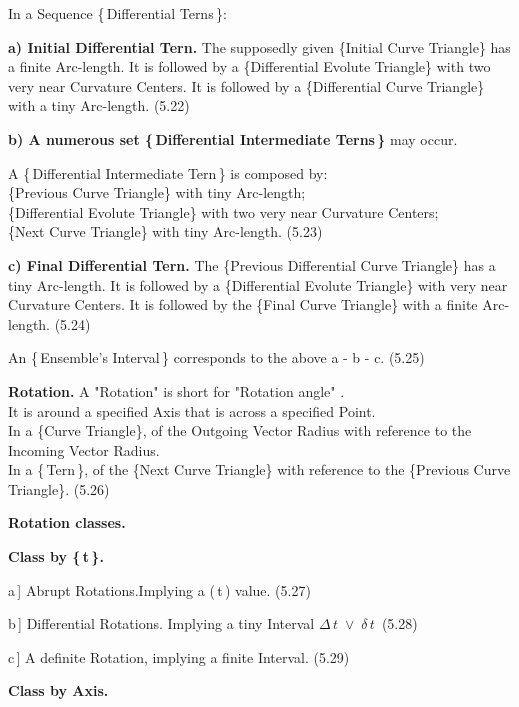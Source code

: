 \documentclass[12pt]{article} %
\begin{document}
\noindent In a Sequence \{\,Differential Terns\,\}:
 
\noindent \textbf{a) Initial Differential Tern.} The supposedly given \{Initial Curve Triangle\} has a finite Arc-length. It is followed by a \{Differential Evolute Triangle\} with two very near Curvature Centers. It is followed by a \{Differential Curve Triangle\} with a tiny Arc-length. \qquad \qquad (5.22)

\noindent \textbf{b) A numerous set \{\,Differential Intermediate Terns\,\}} may occur.

\noindent A \{\,Differential Intermediate Tern\,\} is composed by:\\ \{Previous Curve Triangle\} with tiny Arc-length;\\\{Differential Evolute Triangle\} with two very near Curvature Centers;\\\{Next Curve Triangle\} with tiny Arc-length. (5.23) 

\noindent \textbf{c) Final Differential Tern.} The \{Previous Differential Curve Triangle\} has a tiny Arc-length. It is followed by a \{Differential Evolute Triangle\} with very near Curvature Centers. It is followed by the \{Final Curve Triangle\} with a finite Arc-length. \qquad \qquad (5.24)

\noindent An \{\,Ensemble's Interval\,\} corresponds to the above\; a - b - c. \qquad  (5.25) 

\noindent \textbf{Rotation.} A "Rotation" is short for "Rotation angle" .\\It is around a specified Axis that is across a specified Point.
\\In a \{Curve Triangle\}, of the Outgoing Vector Radius with reference to the Incoming Vector Radius.\\In a \{\,Tern\,\}, of the \{Next Curve Triangle\} with reference to the \{Previous Curve Triangle\}. \qquad \qquad (5.26) 

\noindent \textbf{Rotation classes.}

\noindent \textbf{Class by \{\,t\,\}.}

\noindent a\,] Abrupt Rotations.\quad Implying a (\,t\,) value. \qquad (5.27)

\noindent b\,] Differential Rotations. Implying a tiny Interval\; $\Delta\,t\;\vee\;\delta\,t$\, \qquad (5.28)

\noindent c\,] A definite Rotation, implying a finite Interval. (5.29)                      

\noindent \textbf{Class by Axis.}
\end{document}
